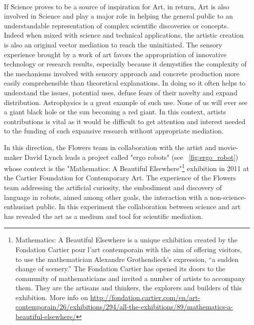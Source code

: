 \begin{figure}[!t]
\centering
    \\
    \hfil
    \caption{}
    \label{fig:chronophotography_history}
\end{figure}


If Science proves to be a source of inspiration for Art, in return, Art is also involved in Science and play a major role in helping the general public to an understandable representation of complex scientific discoveries or concepts. Indeed when mixed with science and technical applications, the artistic creation is also an original vector mediation to reach the uninitiated. The sensory experience brought by a work of art  favors the appropriation of innovative technology or research results, especially because it demystifies the complexity of the mechanisms involved with sensory approach and concrete production more easily comprehensible than theoretical explanations. In doing so it often helps to understand the issues, potential uses, defuse fears of their novelty and expand distribution.
Astrophysics is a great example of such use. None of us will ever see a giant black hole or the sun becoming a red giant. In this context, artists contributions is vital as it would be difficult to get attention and interest needed to the funding of such expansive research without appropriate mediation.


In this direction, the Flowers team in collaboration with the artist and movie-maker David Lynch leads a project called "ergo robots" (see \figurename~\ref{fig:ergo_robot}) whose context is the "Mathematics: A Beautiful Elsewhere"\footnote{Mathematics: A Beautiful Elsewhere is a unique exhibition created by the Fondation Cartier pour l’art contemporain with the aim of offering visitors, to use the mathematician Alexandre Grothendieck’s expression, “a sudden change of scenery.” The Fondation Cartier has opened its doors to the community of mathematicians and invited a number of artists to accompany them. They are the artisans and thinkers, the explorers and builders of this exhibition. More info on \url{http://fondation.cartier.com/en/art-contemporain/26/exhibitions/294/all-the-exhibitions/89/mathematics-a-beautiful-elsewhere/}} exhibition in 2011 at the Cartier Foundation for Contemporary Art. The experience of the Flowers team addressing the artificial curiosity, the embodiment and discovery of language in robots, aimed among other goals, the interaction with a non-science-enthusiast public. In this experiment the collaboration between science and art has revealed the art as a medium and tool for scientific mediation.

